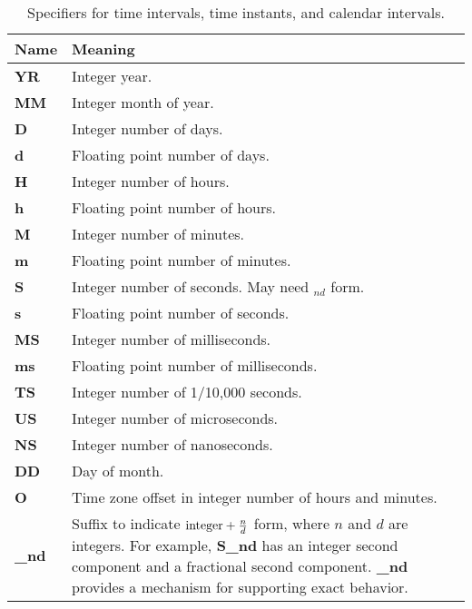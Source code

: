\begin{table}
\caption{\label{time-abbrevs}Specifiers for time intervals, time instants, and calendar intervals.}
\begin{tabular}{|p{1in}|p{3.5in}|}
\hline
Name & Meaning \\
\hline\hline
{\bf YR} & Integer year. \\
\hline
{\bf MM} & Integer month of year. \\
\hline
{\bf D} & Integer number of days. \\
\hline
{\bf d} & Floating point number of days. \\
\hline
{\bf H} & Integer number of hours. \\
\hline
{\bf h} & Floating point number of hours. \\
\hline
{\bf M} & Integer number of minutes. \\
\hline
{\bf m} & Floating point number of minutes. \\
\hline
{\bf S} & Integer number of seconds. May need $_{nd}$ form.\\
\hline
{\bf s} & Floating point number of seconds. \\
\hline
{\bf MS} & Integer number of milliseconds. \\
\hline
{\bf ms} & Floating point number of milliseconds. \\
\hline
{\bf TS} & Integer number of 1/10,000 seconds. \\
\hline
{\bf US} & Integer number of microseconds. \\
\hline
{\bf NS} & Integer number of nanoseconds. \\
\hline
{\bf DD} & Day of month. \\
\hline
{\bf O} & Time zone offset in integer number of hours and minutes. \\
\hline
{\bf \_nd} & Suffix to indicate {\bf $ {\rm integer} + \frac{n}{d}$} form,
where $n$ and $d$ are integers. For example, {\bf S\_nd} has an integer
second component and a fractional second component. {\bf \_nd} provides 
a mechanism for supporting exact behavior.
\\
\hline
\end{tabular}
\end{table}







